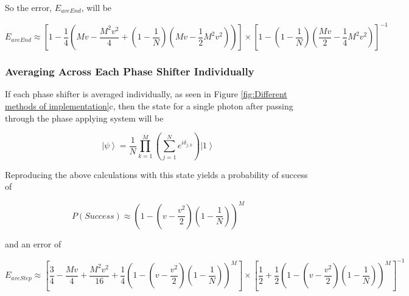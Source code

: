 \documentclass[aps,pra,twocolumn,superscriptaddress,numerical]{revtex4-1}
\begin{document}
		
		So the error, $E_{aveEnd}$, will be
		
		\begin{widetext}
			\begin{equation}
			E_{aveEnd}  \approx  \left[1-\frac{1}{4}\left(Mv-\frac{M^{2}v^{2}}{4}+\left(1-\frac{1}{N}\right)\left(Mv-\frac{1}{2}M^{2}v^{2}\right)\right)\right]\nonumber\times\left[1-\left(1-\frac{1}{N}\right)\left(\frac{Mv}{2}-\frac{1}{4}M^{2}v^{2}\right)\right]^{-1}\label{eq:ErrorAvEnd}
			\end{equation}
		\end{widetext}
		
		
		\subsubsection{Averaging Across Each Phase Shifter Individually\label{Averaging Across Each Phase Shifter Individually}}
		
		If each phase shifter is averaged individually, as seen in Figure \ref{fig:Different methods of implementation}c, then the state for a single photon after passing through the phase applying system will be
		
		\begin{equation}
		\left|\psi\right\rangle =\frac{1}{N}\prod_{k=1}^{M}\left(\sum_{j=1}^{N}e^{i\delta_{j,k}}\right)\left|1\right\rangle \label{eq:AveStepPhaseState}
		\end{equation}
		
		
		Reproducing the above calculations with this state yields a probability of success of
		
		\begin{equation}
		P\left(Success\right)\approx\left(1-\left(v-\frac{v^{2}}{2}\right)\left(1-\frac{1}{N}\right)\right)^{M}\label{eq:AvStepProbSuccess}
		\end{equation}
		
		
		and an error of
		
		\begin{widetext}
			\begin{equation}
			E_{aveStep} \approx  \left[\frac{3}{4}-\frac{Mv}{4}+\frac{M^{2}v^{2}}{16}+\frac{1}{4}\left(1-\left(v-\frac{v^{2}}{2}\right)\left(1-\frac{1}{N}\right)\right)^{M}\right]\nonumber\times\left[\frac{1}{2}+\frac{1}{2}\left(1-\left(v-\frac{v^{2}}{2}\right)\left(1-\frac{1}{N}\right)\right)^{M}\right]^{-1}\label{eq:ErrorAvStep}
			\end{equation}
		\end{widetext}	
		
\end{document}

